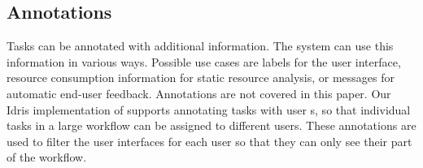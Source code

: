 \subsection{Annotations}

Tasks can be annotated with additional information.
The system can use this information in various ways.
Possible use cases are labels for the user interface, resource consumption information for static resource analysis, or messages for automatic end-user feedback.
Annotations are not covered in this paper.
Our Idris implementation of \TOPHAT supports annotating tasks with user \ID{}s, so that individual tasks in a large workflow can be assigned to different users.
These annotations are used to filter the user interfaces for each user so that they can only see their part of the workflow.


%
%
%
%
